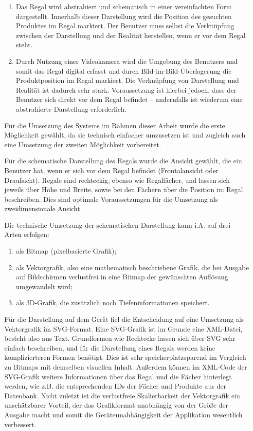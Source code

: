 \begin{enumerate}
	\item Das Regal wird abstrahiert und schematisch in einer vereinfachten Form dargestellt. Innerhalb dieser Darstellung wird die Position des gesuchten Produktes im Regal markiert. Der Benutzer muss selbst die Verknüpfung zwischen der Darstellung und der Realität herstellen, wenn er vor dem Regal steht.
	\item Durch Nutzung einer Videokamera wird die Umgebung des Benutzers und somit das Regal digital erfasst und durch Bild-im-Bild-Überlagerung die Produktposition im Regal markiert. Die Verknüpfung von Darstellung und Realität ist dadurch sehr stark. Voraussetzung ist hierbei jedoch, dass der Benutzer sich direkt vor dem Regal befindet -- andernfalls ist wiederum eine abstrahierte Darstellung erforderlich.
\end{enumerate}

Für die Umsetzung des Systems im Rahmen dieser Arbeit wurde die erste Möglichkeit gewählt, da sie technisch einfacher umzusetzen ist und zugleich auch eine Umsetzung der zweiten Möglichkeit vorbereitet.

Für die schematische Darstellung des Regals wurde die Ansicht gewählt, die ein Benutzer hat, wenn er sich vor dem Regal befindet (Frontalansicht oder Draufsicht). Regale sind rechteckig, ebenso wie Regalfächer, und lassen sich jeweils über Höhe und Breite, sowie bei den Fächern über die Position im Regal beschreiben. Dies sind optimale Voraussetzungen für die Umsetzung als zweidimensionale Ansicht.

Die technische Umsetzung der schematischen Darstellung kann i.A. auf drei Arten erfolgen:

\begin{enumerate}
	\item als Bitmap (pixelbasierte Grafik);
	\item als Vektorgrafik, also eine mathematisch beschriebene Grafik, die bei Ausgabe auf Bildschirmen verlustfrei in eine Bitmap der gewünschten Auflösung umgewandelt wird; 
	\item als \acs{3D}-Grafik, die zusätzlich noch Tiefeninformationen speichert.
\end{enumerate}

Für die Darstellung auf dem Gerät fiel die Entscheidung auf eine Umsetzung als Vektorgrafik im \acs{SVG}-Format. Eine \acs{SVG}-Grafik ist im Grunde eine \acs{XML}-Datei, besteht also aus Text. Grundformen wie Rechtecke lassen sich über \acs{SVG} sehr einfach beschreiben, und für die Darstellung eines Regals werden keine komplizierteren Formen benötigt. Dies ist sehr speicherplatzsparend im Vergleich zu Bitmaps mit demselben visuellen Inhalt. Außerdem können im \acs{XML}-Code der \acs{SVG}-Grafik weitere Informationen über das Regal und die Fächer hinterlegt werden, wie z.B. die entsprechenden IDs der Fächer und Produkte aus der Datenbank. Nicht zuletzt ist die verlustfreie Skalierbarkeit der Vektorgrafik ein unschätzbarer Vorteil, der das Grafikformat unabhängig von der Größe der Ausgabe macht und somit die Geräteunabhängigkeit der Applikation wesentlich verbessert.

